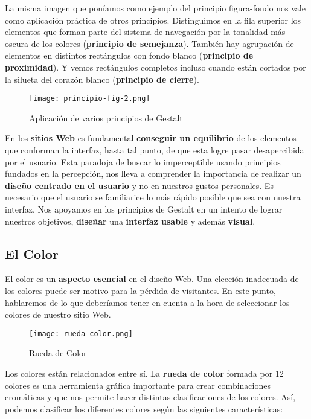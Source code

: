 La misma imagen que poníamos como ejemplo del principio figura-fondo nos vale como aplicación práctica de otros principios. Distinguimos en la fila superior los elementos que forman parte del sistema de navegación por la tonalidad más oscura de los colores (\textbf{principio de semejanza}). También hay agrupación de elementos en distintos rectángulos con fondo blanco (\textbf{principio de proximidad}). Y vemos rectángulos completos incluso cuando están cortados por la silueta del corazón blanco (\textbf{principio de cierre}).

\begin{figure}[H]
    \centering
    \texttt{[image: principio-fig-2.png]}
    \caption{Aplicación de varios principios de Gestalt}
\end{figure}

En los \textbf{sitios Web } es fundamental \textbf{conseguir un equilibrio} de los elementos que conforman la interfaz, hasta tal punto, de que esta logre pasar desapercibida por el usuario. Esta paradoja de buscar lo imperceptible usando principios fundados en la percepción, nos lleva a comprender la importancia de realizar un \textbf{diseño centrado en el usuario} y no en nuestros gustos personales. Es necesario que el usuario se familiarice lo más rápido posible que sea con nuestra interfaz. Nos apoyamos en los principios de Gestalt en un intento de lograr nuestros objetivos, \textbf{diseñar} una \textbf{interfaz usable} y además \textbf{visual}.

\subsection{El Color}
El color\textbf{} es un \textbf{aspecto esencial} en el diseño Web. Una elección inadecuada de los colores puede ser motivo para la pérdida de visitantes. En este punto, hablaremos de lo que deberíamos tener en cuenta a la hora de seleccionar los colores de nuestro sitio Web.

\begin{figure}[H]
    \centering
    \texttt{[image: rueda-color.png]}
    \caption{Rueda de Color}
\end{figure}

Los colores están relacionados entre sí. La \textbf{rueda de color} formada por 12 colores es una herramienta gráfica importante para crear combinaciones cromáticas y que nos permite hacer distintas clasificaciones de los colores. Así, podemos clasificar los diferentes colores según las siguientes características:

